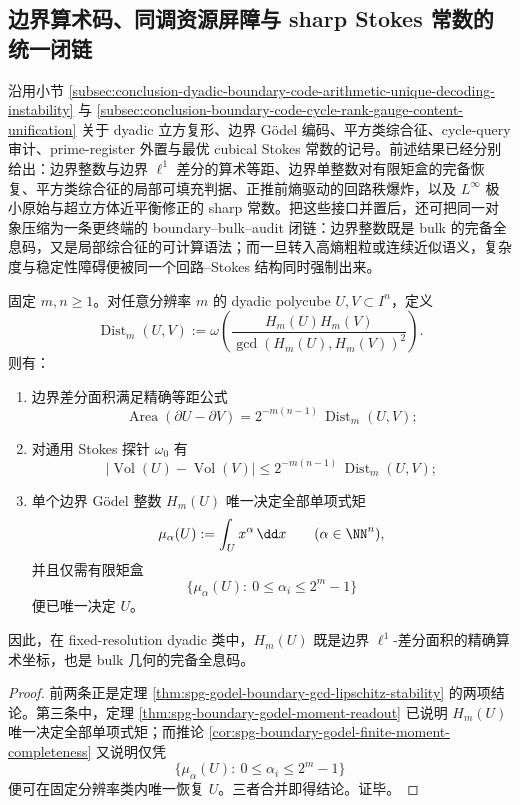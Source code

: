 \subsection{边界算术码、同调资源屏障与 sharp Stokes 常数的统一闭链}\label{subsec:conclusion-boundary-bulk-audit-cycle-stokes-duality}

沿用小节 \ref{subsec:conclusion-dyadic-boundary-code-arithmetic-unique-decoding-instability} 与 \ref{subsec:conclusion-boundary-code-cycle-rank-gauge-content-unification} 关于 dyadic 立方复形、边界 Gödel 编码、平方类综合征、cycle-query 审计、prime-register 外置与最优 cubical Stokes 常数的记号。前述结果已经分别给出：边界整数与边界 \(\ell^1\) 差分的算术等距、边界单整数对有限矩盒的完备恢复、平方类综合征的局部可填充判据、正推前熵驱动的回路秩爆炸，以及 \(L^\infty\) 极小原始与超立方体近平衡修正的 sharp 常数。把这些接口并置后，还可把同一对象压缩为一条更终端的 boundary--bulk--audit 闭链：边界整数既是 bulk 的完备全息码，又是局部综合征的可计算语法；而一旦转入高熵粗粒或连续近似语义，复杂度与稳定性障碍便被同一个回路--Stokes 结构同时强制出来。

\begin{theorem}[单一边界整数的算术等距与有限矩全息完备性]\label{thm:conclusion-boundary-single-integer-arithmetic-moment-completeness}
固定 \(m,n\ge 1\)。对任意分辨率 \(m\) 的 dyadic polycube \(U,V\subset I^n\)，定义
\[
\operatorname{Dist}_m(U,V)
:=
\omega\!\left(\frac{H_m(U)H_m(V)}{\gcd(H_m(U),H_m(V))^2}\right).
\]
则有：
\begin{enumerate}
  \item 边界差分面积满足精确等距公式
  \[
  \operatorname{Area}(\partial U-\partial V)
  =
  2^{-m(n-1)}\,\operatorname{Dist}_m(U,V);
  \]
  \item 对通用 Stokes 探针 \(\omega_0\) 有
  \[
  \bigl|\operatorname{Vol}(U)-\operatorname{Vol}(V)\bigr|
  \le
  2^{-m(n-1)}\,\operatorname{Dist}_m(U,V);
  \]
  \item 单个边界 Gödel 整数 \(H_m(U)\) 唯一决定全部单项式矩
  \[
  \mu_\alpha(U):=\int_U x^\alpha\,\dd x
  \qquad
  (\alpha\in\NN^n),
  \]
  并且仅需有限矩盒
  \[
  \{\mu_\alpha(U):\ 0\le \alpha_i\le 2^m-1\}
  \]
  便已唯一决定 \(U\)。
\end{enumerate}
因此，在 fixed-resolution dyadic 类中，\(H_m(U)\) 既是边界 \(\ell^1\)-差分面积的精确算术坐标，也是 bulk 几何的完备全息码。
\end{theorem}
\begin{proof}
前两条正是定理 \ref{thm:spg-godel-boundary-gcd-lipschitz-stability} 的两项结论。第三条中，定理 \ref{thm:spg-boundary-godel-moment-readout} 已说明 \(H_m(U)\) 唯一决定全部单项式矩；而推论 \ref{cor:spg-boundary-godel-finite-moment-completeness} 又说明仅凭
\[
\{\mu_\alpha(U):\ 0\le \alpha_i\le 2^m-1\}
\]
便可在固定分辨率类内唯一恢复 \(U\)。三者合并即得结论。证毕。
\end{proof}

